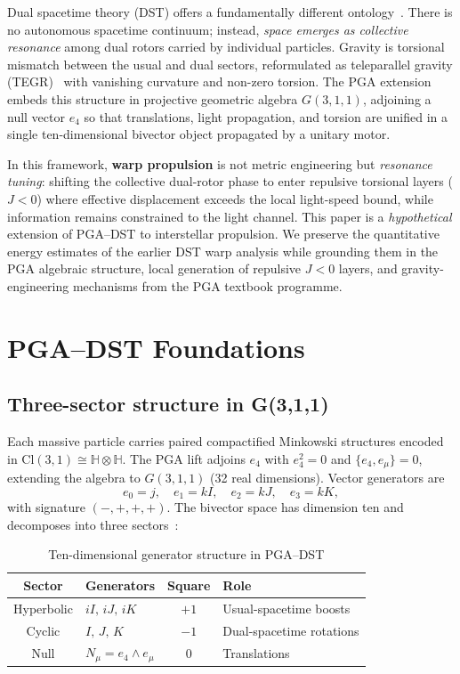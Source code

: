 \documentclass[dvipdfmx,a4paper]{article}
\theoremstyle{definition}
\begin{document}
Dual spacetime theory (DST) offers a fundamentally different ontology~\cite{dual2025}. There is no autonomous spacetime continuum; instead, \emph{space emerges as collective resonance} among dual rotors carried by individual particles. Gravity is torsional mismatch between the usual and dual sectors, reformulated as teleparallel gravity (TEGR)~\cite{tegr} with vanishing curvature and non-zero torsion. The PGA extension~\cite{pga2025} embeds this structure in projective geometric algebra $G(3,1,1)$, adjoining a null vector $e_4$ so that translations, light propagation, and torsion are unified in a single ten-dimensional bivector object propagated by a unitary motor.

In this framework, \textbf{warp propulsion} is not metric engineering but \emph{resonance tuning}: shifting the collective dual-rotor phase to enter repulsive torsional layers ($J<0$) where effective displacement exceeds the local light-speed bound, while information remains constrained to the light channel. This paper is a \emph{hypothetical} extension of PGA--DST to interstellar propulsion. We preserve the quantitative energy estimates of the earlier DST warp analysis while grounding them in the PGA algebraic structure, local generation of repulsive $J<0$ layers, and gravity-engineering mechanisms from the PGA textbook programme.

\section{PGA--DST Foundations}
\label{sec:foundations}

\subsection{Three-sector structure in G(3,1,1)}

Each massive particle carries paired compactified Minkowski structures encoded in $\mathrm{Cl}(3,1)\cong\mathbb{H}\otimes\mathbb{H}$. The PGA lift adjoins $e_4$ with $e_4^2=0$ and $\{e_4,e_\mu\}=0$, extending the algebra to $G(3,1,1)$ (32 real dimensions). Vector generators are
\[
e_0=j,\quad e_1=kI,\quad e_2=kJ,\quad e_3=kK,
\]
with signature $(-,+,+,+)$. The bivector space has dimension ten and decomposes into three sectors~\cite{pga2025}:

\begin{table}[ht]
\centering
\caption{Ten-dimensional generator structure in PGA--DST}
\label{tab:generators}
\begin{tabular}{@{}clcl@{}}
\toprule
Sector & Generators & Square & Role \\
\midrule
Hyperbolic & $iI,\, iJ,\, iK$ & $+1$ & Usual-spacetime boosts \\
Cyclic & $I,\, J,\, K$ & $-1$ & Dual-spacetime rotations \\
Null & $N_\mu=e_4\wedge e_\mu$ & $0$ & Translations \\
\bottomrule
\end{tabular}
\end{table}
\end{document}
